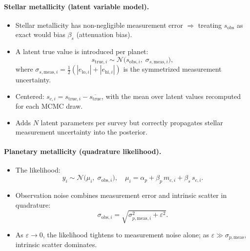 \documentclass[twocolumn]{aastex631}
\begin{document}
\paragraph{Stellar metallicity (latent variable model).}
\begin{itemize}
    \item Stellar metallicity has non-negligible measurement error
          $\Rightarrow$ treating $s_{\mathrm{obs}}$ as exact would
          bias $\beta_s$ (attenuation bias).
    \item A latent true value is introduced per planet:
    \begin{equation}\label{eq:latent_s}
        s_{\mathrm{true},i} \sim \mathcal{N}\bigl(s_{\mathrm{obs},i},
        \;\sigma_{s,\mathrm{meas},i}\bigr),
    \end{equation}
    where $\sigma_{s,\mathrm{meas},i} = \tfrac{1}{2}
    (|e_{\mathrm{lo},i}| + |e_{\mathrm{hi},i}|)$ is the symmetrized
    measurement uncertainty.
    \item Centered: $s_{c,i} = s_{\mathrm{true},i}
          - \overline{s_{\mathrm{true}}}$, with the mean over latent
          values recomputed for each MCMC draw.
    \item Adds $N$ latent parameters per survey but correctly
          propagates stellar measurement uncertainty into the
          posterior.
\end{itemize}

\paragraph{Planetary metallicity (quadrature likelihood).}
\begin{itemize}
    \item The likelihood:
    \begin{equation}\label{eq:likelihood}
        y_i \sim \mathcal{N}\bigl(\mu_i,\;
        \sigma_{\mathrm{obs},i}\bigr),
        \quad
        \mu_i = \alpha_p + \beta_p\, m_{c,i} + \beta_s\, s_{c,i}.
    \end{equation}
    \item Observation noise combines measurement error and intrinsic
          scatter in quadrature:
    \begin{equation}\label{eq:obssigma}
        \sigma_{\mathrm{obs},i}
        = \sqrt{\sigma_{p,\mathrm{meas},i}^{2} + \varepsilon^2}.
    \end{equation}
    \item As $\varepsilon \to 0$, the likelihood tightens to
          measurement noise alone; as
          $\varepsilon \gg \sigma_{p,\mathrm{meas}}$, intrinsic
          scatter dominates.
\end{itemize}
\end{document}
